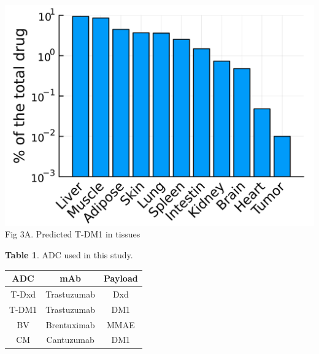 \documentclass[portrait,fontscale=0.3,paperwidth=36in,paperheight=48in]{baposter}
\begin{document}
\begin{poster}
{\begin{minipage}[ht]{0.42\linewidth}
\end{minipage}
\hspace{0.01\linewidth}
\begin{minipage}[ht]{0.3\linewidth}
\centering
\includegraphics[width= \textwidth]{../img/t-dm1-total-mass-tissue.png}
\scriptsize{Fig 3A. Predicted T-DM1 in tissues }
\end{minipage}
\hspace{0.01\linewidth}
\begin{minipage}[ht]{0.23\linewidth}
\begin{center}
\fontsize{7pt}{7pt}\selectfont
\textbf{Table 1}. ADC used in this study. \\
\begin{tabular}{ c c c }
\hline
ADC & mAb & Payload \\ 
\hline
T-Dxd & Trastuzumab & Dxd  \\  
T-DM1 & Trastuzumab & DM1 \\
BV & Brentuximab & MMAE  \\  
CM & Cantuzumab & DM1 \\  
\hline
\end{tabular}
\end{center}
\end{minipage}



}
\end{poster}
\end{document}

